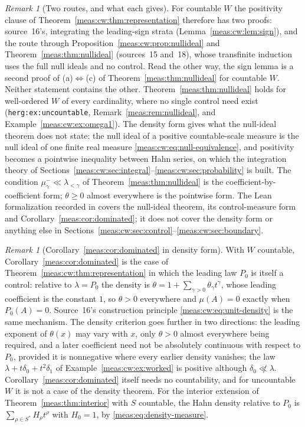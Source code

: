 \documentclass[11pt]{article}
\numberwithin{equation}{section}
\theoremstyle{definition}
\theoremstyle{remark}
\newtheorem{remark}[theorem]{Remark}
\begin{document}
\begin{remark}[Two routes, and what each gives]\label{meas:cw:rem:routes}
For countable $W$ the positivity clause of
Theorem~\ref{meas:cw:thm:representation} therefore has two proofs: source~16's,
integrating the leading-sign strata (Lemma~\ref{meas:cw:lem:sign}), and the
route through Proposition~\ref{meas:cw:prop:nullideal} and
Theorem~\ref{meas:thm:nullideal} (sources~15 and~18), whose transfinite
induction uses the full null ideals and no control. Read the other way, the
sign lemma is a second proof of (a)$\Leftrightarrow$(c) of
Theorem~\ref{meas:thm:nullideal} for countable $W$. Neither statement contains
the other. Theorem~\ref{meas:thm:nullideal} holds for well-ordered $W$ of every
cardinality, where no single control need exist
(\texttt{herg:ex:uncountable}, Remark~\ref{meas:rem:nullideal}, and
Example~\ref{meas:cw:ex:omega1}). The density form gives what the null-ideal
theorem does not state: the null ideal of a positive countable-scale measure is
the null ideal of one finite real measure \eqref{meas:cw:eq:null-equivalence},
and positivity becomes a pointwise inequality between Hahn series, on which the
integration theory of Sections~\ref{meas:cw:sec:integral}--\ref{meas:cw:sec:probability}
is built. The condition $\mu_\gamma^-\ll\lambda_{<\gamma}$ of
Theorem~\ref{meas:thm:nullideal} is the coefficient-by-coefficient form; $\theta\ge0$
almost everywhere is the pointwise form. The Lean formalization recorded in
 covers the null-ideal theorem, its control-measure
form and Corollary~\ref{meas:cor:dominated}; it does not cover the density form
or anything else in Sections~\ref{meas:cw:sec:control}--\ref{meas:cw:sec:boundary}.
\end{remark}

\begin{remark}[Corollary~\ref{meas:cor:dominated} in density form]
\label{meas:cw:rem:dominated}
With $W$ countable, Corollary~\ref{meas:cor:dominated} is the case of
Theorem~\ref{meas:cw:thm:representation} in which the leading law $P_0$ is itself
a control: relative to $\lambda=P_0$ the density is
$\theta=1+\sum_{\gamma>0}\theta_\gamma t^\gamma$, whose leading coefficient is the
constant $1$, so $\theta>0$ everywhere and $\mu(A)=0$ exactly when $P_0(A)=0$.
Source~16's construction principle \eqref{meas:cw:eq:unit-density} is the same
mechanism. The density criterion goes further in two directions: the leading
exponent of $\theta(x)$ may vary with $x$, only $\theta>0$ almost everywhere being
required, and a later coefficient need not be absolutely continuous
with respect to $P_0$, provided it is nonnegative where every earlier density
vanishes; the law $\lambda+t\delta_0+t^2\delta_1$ of
Example~\ref{meas:cw:ex:worked} is positive although $\delta_0\not\ll\lambda$.
Corollary~\ref{meas:cor:dominated} itself needs no countability, and for
uncountable $W$ it is not a case of the density theorem. For the interior
extension of Theorem~\ref{meas:thm:interior} with $S$ countable, the Hahn
density relative to $P_0$ is $\sum_{\rho\in S^*}H_\rho t^\rho$ with $H_0=1$, by
\eqref{meas:eq:density-measure}.
\end{remark}
\end{document}
